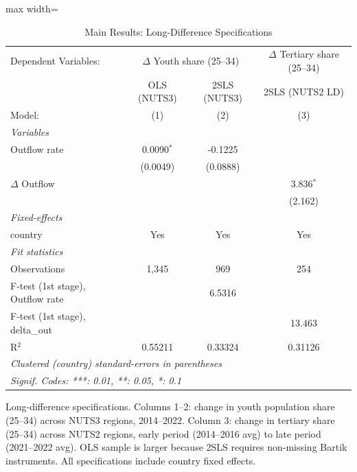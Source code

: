 \begin{table}[htbp]
   \caption{\label{tab:main_nuts3} Main Results: Long-Difference Specifications}
   \centering
   \scriptsize
   \begin{adjustbox}{max width=\textwidth}
   \begin{tabular}{lccc}
      \tabularnewline \midrule \midrule
      Dependent Variables: & \multicolumn{2}{c}{$\Delta$ Youth share (25--34)} & $\Delta$ Tertiary share (25--34)\\
                                       & OLS (NUTS3)  & 2SLS (NUTS3) & 2SLS (NUTS2 LD) \\   
      Model:                           & (1)          & (2)          & (3)\\  
      \midrule
      \emph{Variables}\\
      Outflow rate                     & 0.0090$^{*}$ & -0.1225      &   \\   
                                       & (0.0049)     & (0.0888)     &   \\   
      $\Delta$ Outflow                 &              &              & 3.836$^{*}$\\   
                                       &              &              & (2.162)\\   
      \midrule
      \emph{Fixed-effects}\\
      country                          & Yes          & Yes          & Yes\\  
      \midrule
      \emph{Fit statistics}\\
      Observations                     & 1,345        & 969          & 254\\  
      F-test (1st stage), Outflow rate &              & 6.5316       & \\  
      F-test (1st stage), delta\_out   &              &              & 13.463\\  
      R$^2$                            & 0.55211      & 0.33324      & 0.31126\\  
      \midrule \midrule
      \multicolumn{4}{l}{\emph{Clustered (country) standard-errors in parentheses}}\\
      \multicolumn{4}{l}{\emph{Signif. Codes: ***: 0.01, **: 0.05, *: 0.1}}\\
   \end{tabular}
   \end{adjustbox}
   
   \par \raggedright 
   Long-difference specifications. Columns 1--2: change in youth population share (25--34) across NUTS3 regions, 2014--2022. Column 3: change in tertiary share (25--34) across NUTS2 regions, early period (2014--2016 avg) to late period (2021--2022 avg). OLS sample is larger because 2SLS requires non-missing Bartik instruments. All specifications include country fixed effects.
\end{table}
